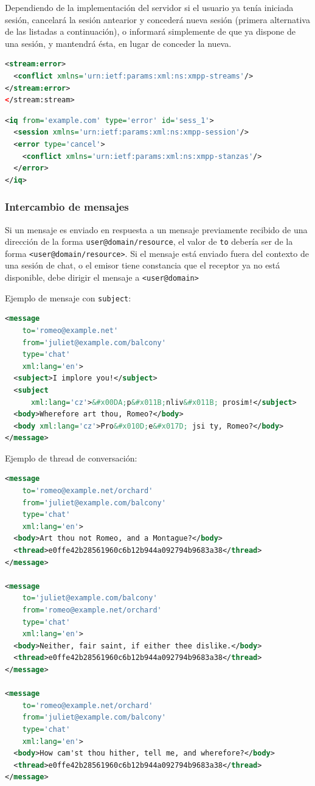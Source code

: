 \documentclass[a4paper, 11pt]{article} %
\begin{document}
    Dependiendo de la implementación del servidor si el usuario ya tenía iniciada sesión, cancelará la sesión antearior
    y concederá nueva sesión (primera alternativa de las listadas a continuación), o informará simplemente de que ya
    dispone de una sesión, y mantendrá ésta, en lugar de conceder la nueva.
    
\begin{lstlisting}[language=XML]
<stream:error>
  <conflict xmlns='urn:ietf:params:xml:ns:xmpp-streams'/>
</stream:error>
</stream:stream>
\end{lstlisting}
\begin{lstlisting}[language=XML]
<iq from='example.com' type='error' id='sess_1'>
  <session xmlns='urn:ietf:params:xml:ns:xmpp-session'/>
  <error type='cancel'>
    <conflict xmlns='urn:ietf:params:xml:ns:xmpp-stanzas'/>
  </error>
</iq>
\end{lstlisting}

    \subsubsection{Intercambio de mensajes}
      Si un mensaje es enviado en respuesta a un mensaje previamente recibido de una dirección de la forma 
      \texttt{user@domain/resource}, el valor de \texttt{to} debería ser de la forma \texttt{<user@domain/resource>}. Si el
      mensaje está enviado fuera del contexto de una sesión de chat, o el emisor tiene constancia que el receptor ya no
      está disponible, debe dirigir el mensaje a \texttt{<user@domain>}
      
      Ejemplo de mensaje con \texttt{subject}:
\begin{lstlisting}[language=XML]  
<message
    to='romeo@example.net'
    from='juliet@example.com/balcony'
    type='chat'
    xml:lang='en'>
  <subject>I implore you!</subject>
  <subject
      xml:lang='cz'>&#x00DA;p&#x011B;nliv&#x011B; prosim!</subject>
  <body>Wherefore art thou, Romeo?</body>
  <body xml:lang='cz'>Pro&#x010D;e&#x017D; jsi ty, Romeo?</body>
</message> 
\end{lstlisting}
  
      Ejemplo de thread de conversación:
\begin{lstlisting}[language=XML]        
<message
    to='romeo@example.net/orchard'
    from='juliet@example.com/balcony'
    type='chat'
    xml:lang='en'>
  <body>Art thou not Romeo, and a Montague?</body>
  <thread>e0ffe42b28561960c6b12b944a092794b9683a38</thread>
</message>

<message
    to='juliet@example.com/balcony'
    from='romeo@example.net/orchard'
    type='chat'
    xml:lang='en'>
  <body>Neither, fair saint, if either thee dislike.</body>
  <thread>e0ffe42b28561960c6b12b944a092794b9683a38</thread>
</message>

<message
    to='romeo@example.net/orchard'
    from='juliet@example.com/balcony'
    type='chat'
    xml:lang='en'>
  <body>How cam'st thou hither, tell me, and wherefore?</body>
  <thread>e0ffe42b28561960c6b12b944a092794b9683a38</thread>
</message>

\end{lstlisting}
\end{document}
